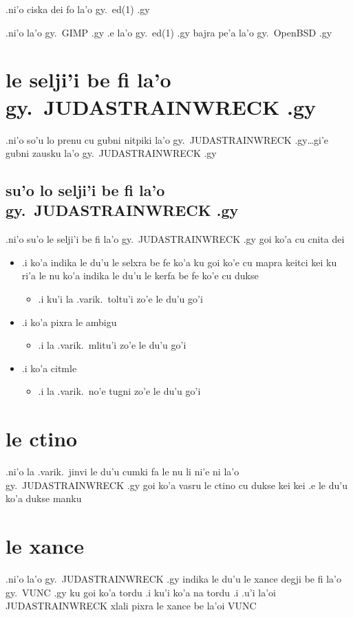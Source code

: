 \documentclass{report}
\begin{document}
.ni'o ciska dei fo la'o gy.\ ed(1) .gy

.ni'o la'o gy.\ GIMP .gy .e la'o gy.\ ed(1) .gy bajra pe'a la'o gy.\ OpenBSD .gy

\section{le selji'i be fi la'o gy.\ JUDASTRAINWRECK .gy}
.ni'o so'u lo prenu cu gubni nitpiki la'o gy.\ JUDASTRAINWRECK .gy\ldots gi'e gubni zausku la'o gy.\ JUDASTRAINWRECK .gy

\subsection{su'o lo selji'i be fi la'o gy.\ JUDASTRAINWRECK .gy}
.ni'o su'o le selji'i be fi la'o gy.\ JUDASTRAINWRECK .gy goi ko'a cu cnita dei

\begin{itemize}
	\item .i ko'a indika le du'u le selxra be fe ko'a ku goi ko'e cu mapra keitci kei ku ri'a le nu ko'a indika le du'u le kerfa be fe ko'e cu dukse 
	\begin{itemize}
		\item .i ku'i la .varik.\ toltu'i zo'e le du'u go'i
	\end{itemize}
	\item .i ko'a pixra le ambigu
	\begin{itemize}
		\item .i la .varik.\ mlitu'i zo'e le du'u go'i
	\end{itemize}
	\item .i ko'a citmle
	\begin{itemize}
		\item .i la .varik.\ no'e tugni zo'e le du'u go'i
	\end{itemize}
\end{itemize}
\section{le ctino}
.ni'o la .varik.\ jinvi le du'u cumki fa le nu li ni'e ni la'o gy.\ JUDASTRAINWRECK .gy goi ko'a vasru le ctino cu dukse kei kei .e le du'u ko'a dukse manku

\section{le xance}
.ni'o la'o gy.\ JUDASTRAINWRECK .gy indika le du'u le xance degji be fi la'o gy.\ VUNC .gy ku goi ko'a tordu  .i ku'i ko'a na tordu  .i .u'i la'oi JUDASTRAINWRECK xlali pixra le xance be la'oi VUNC
\end{document}
